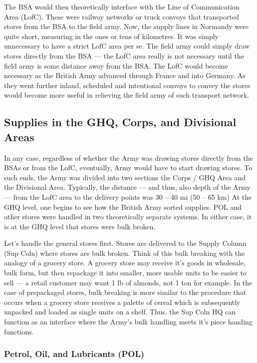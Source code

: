 \documentclass[noraggedright]{turabian-researchpaper}
\newcommand{\SupInWar}{Precis on Lecture ``Supplies in War'', (Part II)}
\begin{document}
The BSA would then theoretically interface with the Line of Communication
Area (LofC).  These were railway networks or truck convoys that transported
stores from the BSA to the field army.  Now, the supply lines in Normandy were
quite short, measuring in the ones or tens of kilometres.  It was simply 
unnecessary to have a strict LofC area per se.  The field army could simply
draw stores directly from the BSA --- the LofC area really is not necessary
until the field army is some distance away from the BSA.  The LofC would 
become necessary as the British Army advanced through France and into 
Germany.  As they went further inland, scheduled and intentional convoys to 
convey the stores would become more useful in relieving the field army of such 
transport network.  

\subsection{Supplies in the GHQ, Corps, and Divisional Areas}

In any case, regardless of whether the Army was drawing stores directly from 
the BSAs or from the LofC, eventually,  Army would have to start drawing
stores.  To such ends, the Army was divided into two sections the 
Corps / GHQ Area and the Divisional Area.  Typically, the distance --- and 
thus, also depth of the Army --- from the LofC area to the delivery points
was 30 -- 40 mi (50 -- 65 km)  At the GHQ level, one begins to
see how the British Army sorted supplies.  POL and other stores were handled
in two theoretically separate systems.  In either case, it is at the GHQ level
that stores were bulk broken.  

Let's handle the general stores first.  Stores are delivered to the Supply
Column (Sup Coln) where stores are bulk broken.  Think of this bulk breaking 
with the analogy of a grocery store.  A grocery store may receive it's goods in 
wholesale, bulk form, but then repackage it into smaller, more usable units to
be easier to sell --- a retail customer may want 1 lb of almonds, not 1 ton
for example.  In the case of prepackaged stores, bulk breaking is more similar
to the procedure that occurs when a grocery store receives a palette of cereal
which is subsequently unpacked and loaded as single units on a shelf.  Thus,
the Sup Coln HQ can function as an interface where the Army's bulk handling 
meets it's piece handing functions.\autocite[\SupInWar][3]{27course}

\subsubsection{Petrol, Oil, and Lubricants (POL)}
\end{document}
